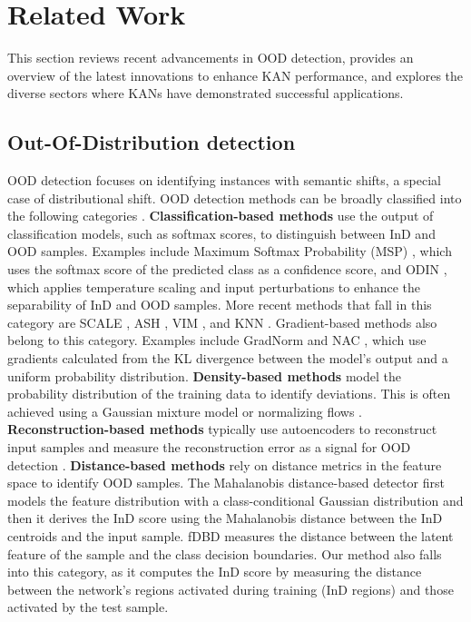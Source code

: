 \section{Related Work}

This section reviews recent advancements in OOD detection, provides an overview of the latest innovations to enhance KAN performance, and explores the diverse sectors where KANs have demonstrated successful applications.

\subsection{Out-Of-Distribution detection}
OOD detection focuses on identifying instances with semantic shifts, a special case of distributional shift.  
OOD detection methods can be broadly classified into the following categories \citep{yang2024generalizedoutofdistributiondetectionsurvey}. 
\textbf{Classification-based methods} use the output of classification models, such as softmax scores, to distinguish between InD and OOD samples. Examples include Maximum Softmax Probability (MSP) \citep{hendrycks2017a}, which uses the softmax score of the predicted class as a confidence score, and ODIN \citep{liang2018enhancing}, which applies temperature scaling and input perturbations to enhance the separability of InD and OOD samples. 
More recent methods that fall in this category are SCALE \citep{xu2024scaling}, ASH \citep{djurisic2023extremely}, VIM \citep{haoqi2022vim}, and KNN \citep{sun2022knnood}. 
Gradient-based methods also belong to this category. 
Examples include GradNorm \citep{huang2021importance} and NAC \citep{liu2024neuron}, which use gradients calculated from the KL divergence between the model's output and a uniform probability distribution.
\textbf{Density-based methods} model the probability distribution of the training data to identify deviations. 
This is often achieved using a Gaussian mixture model \citep{zong2018deep} or normalizing flows \citep{zisselman2020deepresidualflowdistribution, jiang2022revisiting}.
\textbf{Reconstruction-based methods} typically use autoencoders to reconstruct input samples and measure the reconstruction error as a signal for OOD detection \citep{jiang2023readaggregatingreconstructionerror, 9878470}.
\textbf{Distance-based methods} rely on distance metrics in the feature space to identify OOD samples. 
The Mahalanobis distance-based detector \citep{NEURIPS2018_abdeb6f5} first models the feature distribution with a class-conditional Gaussian distribution and then it derives the InD score using the Mahalanobis distance between the InD centroids and the input sample. 
fDBD \citep{liu2024fast} measures the distance between the latent feature of the sample and the class decision boundaries. 
Our method also falls into this category, as it computes the InD score by measuring the distance between the network's regions activated during training (InD regions) and those activated by the test sample.


